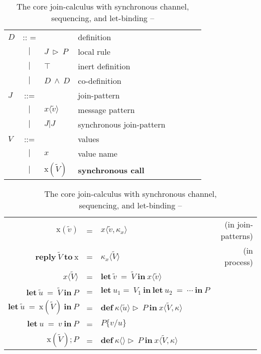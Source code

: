 \begin{table}[h]
\begin{center}
\begin{tabular}{ l c l  l l c l  p{\textwidth} }
$D$& :: =  & & definition \\
&$|$&$J\ \triangleright \ P$&local rule\\
&$|$&$\top$             & inert definition\\
&$|$&$D\ \wedge \ D$&co-definition\\
$J$& ::= & &join-pattern\\
&$|$& $x\langle\widetilde{v}\rangle$ & message pattern\\ 
&$|$&$J|J$&synchronous join-pattern\\
$V$& ::= & &values\\
&$|$&$x$& value name\\
&$|$&$\mathrm{x}(\widetilde{V})$& \bf{synchronous call}\\
  \end{tabular}
  \begin{tabular}{ r c l  r }
\\
    $\mathrm{x}(\widetilde{v})$&=&$x\langle \widetilde{v},\kappa_x\rangle$&(in join-patterns)\\
    $\mathbf{reply}\  \widetilde{V}\ \mathbf{to}\ \mathrm{x}$&=&$\kappa_x\langle\widetilde{V}\rangle$&(in process)
    \\
    $x\langle\widetilde{V}\rangle$&=&$\mathbf{let}\ \widetilde{v}\ =\ \widetilde{V}\ \mathbf{in}\ x\langle\widetilde{v}\rangle$\\
    $\mathbf{let}\ \widetilde{u}\ =\ \widetilde{V}\ \mathbf{in}\ P$&=&$\mathbf{let}\ u_1=\ V_1\ \mathbf{in\ let}\ u_2\ = \ \cdots\ \mathbf{in}\ P$\\
    $\mathbf{let}\ \widetilde{u}\ =\ \mathrm{x}(\widetilde{V})\ \mathbf{in}\ P$&=&$\mathbf{def}\ \kappa\langle\widetilde{u}\rangle\triangleright\ P\ \mathbf{in}\ x\langle\widetilde{V},\kappa\rangle$\\
    $\mathbf{let}\ u\ =\ v\ \mathbf{in}\ P$&=&$P\{v/u\}$\\
    $\mathrm{x}(\widetilde{V});P$&=&$\mathbf{def}\ \kappa\langle\rangle\triangleright\ P\ \mathbf{in}\ x\langle\widetilde{V},\kappa\rangle$

  \end{tabular}
  \end{center}
  \captionsetup{justification=centering}
  \caption{The core join-calculus with synchronous channel, \\ \hspace{2.2cm}    sequencing, and let-binding -- \citep{RCHAM} }
  \label{join_syn_chan}
\end{table}



